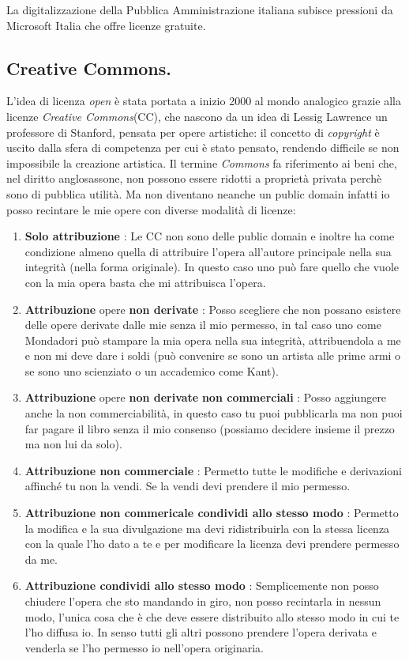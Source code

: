 \documentclass[a4page, 11pt, twocolumn]{article}
\begin{document}
La digitalizzazione della Pubblica Amministrazione italiana subisce pressioni da Microsoft Italia che offre licenze gratuite.

\subsection{Creative Commons.}
L'idea di licenza \textit{open} è stata portata a inizio 2000 al mondo analogico grazie alla licenze \textit{Creative Commons}(CC), che nascono da un idea di Lessig Lawrence un professore di Stanford, pensata per opere artistiche: il concetto di \textit{copyright} è uscito dalla sfera di competenza per cui è stato pensato, rendendo difficile se non impossibile la creazione artistica.
Il termine \textit{Commons} fa riferimento ai beni che, nel diritto anglosassone, non possono essere ridotti a proprietà privata perchè sono di pubblica utilità.
Ma non diventano neanche un public domain infatti io posso recintare le mie opere con diverse modalità di licenze:
\begin{enumerate}
\item  \textbf{Solo attribuzione} : Le CC non sono delle public domain e inoltre ha come condizione almeno quella di attribuire l’opera all’autore principale nella sua integrità (nella forma originale). In questo caso uno può fare quello che vuole con la mia opera basta che mi attribuisca l’opera.
\item \textbf{Attribuzione} opere\textbf{ non derivate} : Posso scegliere che non possano esistere delle opere derivate dalle mie senza il mio permesso, in tal caso uno come Mondadori può stampare la mia opera nella sua integrità, attribuendola a me e non mi deve dare i soldi (può convenire se sono un artista alle prime armi o se sono uno scienziato o un accademico come Kant).
\item \textbf{Attribuzione} opere \textbf{non derivate} \textbf{non commerciali} : Posso aggiungere anche la non commerciabilità, in questo caso tu puoi pubblicarla ma non puoi far pagare il libro senza il mio consenso (possiamo decidere insieme il prezzo ma non lui da solo).
\item \textbf{Attribuzione non commerciale} : Permetto tutte le modifiche e derivazioni affinché tu non la vendi. Se la vendi devi prendere il mio permesso.
\item \textbf{Attribuzione non commericale condividi allo stesso modo} : Permetto la modifica e la sua divulgazione ma devi ridistribuirla con la stessa licenza con la quale l’ho dato a te e per modificare la licenza devi prendere permesso da me.
\item \textbf{Attribuzione condividi allo stesso modo} : Semplicemente non posso chiudere l’opera che sto mandando in giro, non posso recintarla in nessun modo, l’unica cosa che è che deve essere distribuito allo stesso modo in cui te l’ho diffusa io. In senso tutti gli altri possono prendere l’opera derivata e venderla se l’ho permesso io nell’opera originaria.
\end{enumerate}
\end{document}
